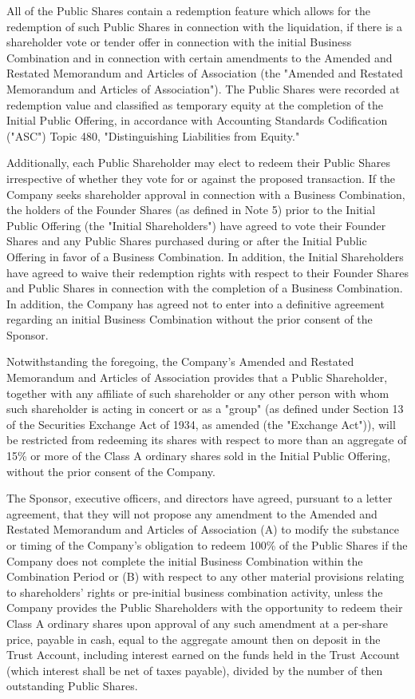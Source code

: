 \documentclass[11pt,a4paper]{article}
\begin{document}
All of the Public Shares contain a redemption feature which allows for the redemption of such Public Shares in connection with the liquidation, if there is a shareholder vote or tender offer in connection with the initial Business Combination and in connection with certain amendments to the Amended and Restated Memorandum and Articles of Association (the "Amended and Restated Memorandum and Articles of Association"). The Public Shares were recorded at redemption value and classified as temporary equity at the completion of the Initial Public Offering, in accordance with Accounting Standards Codification ("ASC") Topic 480, "Distinguishing Liabilities from Equity."

Additionally, each Public Shareholder may elect to redeem their Public Shares irrespective of whether they vote for or against the proposed transaction. If the Company seeks shareholder approval in connection with a Business Combination, the holders of the Founder Shares (as defined in Note 5) prior to the Initial Public Offering (the "Initial Shareholders") have agreed to vote their Founder Shares and any Public Shares purchased during or after the Initial Public Offering in favor of a Business Combination. In addition, the Initial Shareholders have agreed to waive their redemption rights with respect to their Founder Shares and Public Shares in connection with the completion of a Business Combination. In addition, the Company has agreed not to enter into a definitive agreement regarding an initial Business Combination without the prior consent of the Sponsor.

Notwithstanding the foregoing, the Company's Amended and Restated Memorandum and Articles of Association provides that a Public Shareholder, together with any affiliate of such shareholder or any other person with whom such shareholder is acting in concert or as a "group" (as defined under Section 13 of the Securities Exchange Act of 1934, as amended (the "Exchange Act")), will be restricted from redeeming its shares with respect to more than an aggregate of 15\% or more of the Class A ordinary shares sold in the Initial Public Offering, without the prior consent of the Company.

The Sponsor, executive officers, and directors have agreed, pursuant to a letter agreement, that they will not propose any amendment to the Amended and Restated Memorandum and Articles of Association (A) to modify the substance or timing of the Company's obligation to redeem 100\% of the Public Shares if the Company does not complete the initial Business Combination within the Combination Period or (B) with respect to any other material provisions relating to shareholders' rights or pre-initial business combination activity, unless the Company provides the Public Shareholders with the opportunity to redeem their Class A ordinary shares upon approval of any such amendment at a per-share price, payable in cash, equal to the aggregate amount then on deposit in the Trust Account, including interest earned on the funds held in the Trust Account (which interest shall be net of taxes payable), divided by the number of then outstanding Public Shares.
\end{document}
